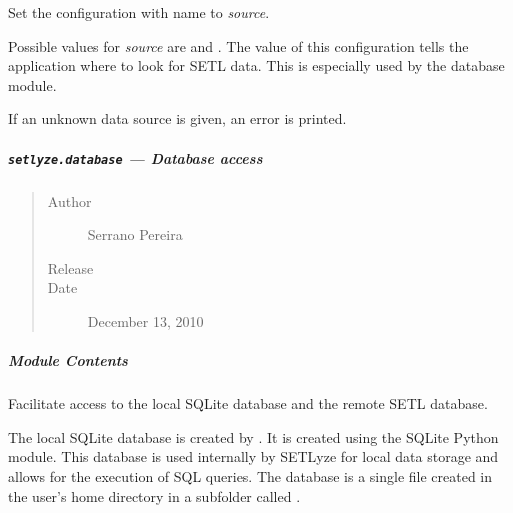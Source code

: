 \documentclass[letterpaper,10pt,english]{sphinxmanual}
\begin{document}
\begin{fulllineitems}
\begin{fulllineitems}
\begin{quote}
\begin{description}
\end{description}
\end{quote}

\end{fulllineitems}


\begin{fulllineitems}
\label{setlyze/config:setlyze.config.ConfigManager.set_data_source}
Set the configuration with name  to \emph{source}.

Possible values for \emph{source} are  and
. The value of this configuration tells the
application where to look for SETL data. This is especially used
by the database module.

If an unknown data source is given, an error is printed.

\end{fulllineitems}


\end{fulllineitems}



\subparagraph{\texttt{setlyze.database} --- Database access}
\label{setlyze/database::doc}\label{setlyze/database:setlyze-database-database-access}\begin{quote}\begin{description}
\item[{Author}] \leavevmode
Serrano Pereira

\item[{Release}] 

\item[{Date}] \leavevmode
December 13, 2010

\end{description}\end{quote}


\subparagraph{Module Contents}
\label{setlyze/database:module-setlyze.database}\label{setlyze/database:module-contents}
Facilitate access to the local SQLite database and the remote SETL
database.

The local SQLite database is created by {\hyperref[setlyze/database:setlyze.database.MakeLocalDB.create_new_db]{}}.
It is created using the SQLite Python module. This database is used
internally by SETLyze for local data storage and allows for the
execution of SQL queries. The database is a single file created in the
user's home directory in a subfolder called .
\end{document}
